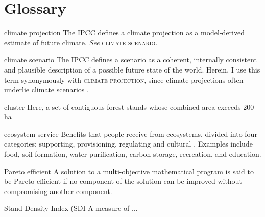 
\chapter*{Glossary}      %
\thispagestyle{plain}
%
\begin{glossary}

\item[climate projection] The IPCC defines a climate projection as a model-derived estimate of future climate. \textit{See} \textsc{climate scenario}\cite{ipcc2013Definition}.

\item[climate scenario] The IPCC defines a scenario as a coherent, internally consistent and plausible description of a possible future state of the world. Herein, I use this term synonymously with \textsc{climate projection}, since climate projections often underlie climate scenarios \cite{ipcc2013Definition}.

\item[cluster] Here, a set of contiguous forest stands whose combined area exceeds 200 ha

\item[ecosystem service] Benefits that people receive from ecosystems, divided into four categories: supporting, provisioning, regulating and cultural \cite{assessment2005ecosystems}. Examples include food, soil formation, water purification, carbon storage, recreation, and education.

\item[Pareto efficient] A solution to a multi-objective mathematical program is said to be Pareto efficient if no component of the solution can be improved without compromising another component.

\item[Stand Density Index (SDI] A measure of $\ldots$
 
\end{glossary}